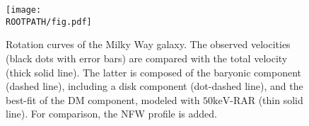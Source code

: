 \begin{figure}%
	\centering%
	\texttt{[image: \\ROOTPATH/fig.pdf]}%
	\caption{Rotation curves of the Milky Way galaxy. The observed velocities (black dots with error bars) are compared with the total velocity (thick solid line). The latter is composed of the baryonic component (dashed line), including a disk component (dot-dashed line), and the best-fit of the DM component, modeled with $50\mathrm{keV}$-RAR (thin solid line). For comparison, the NFW profile is added.}%
\label{fig:mw-rc}
\end{figure}